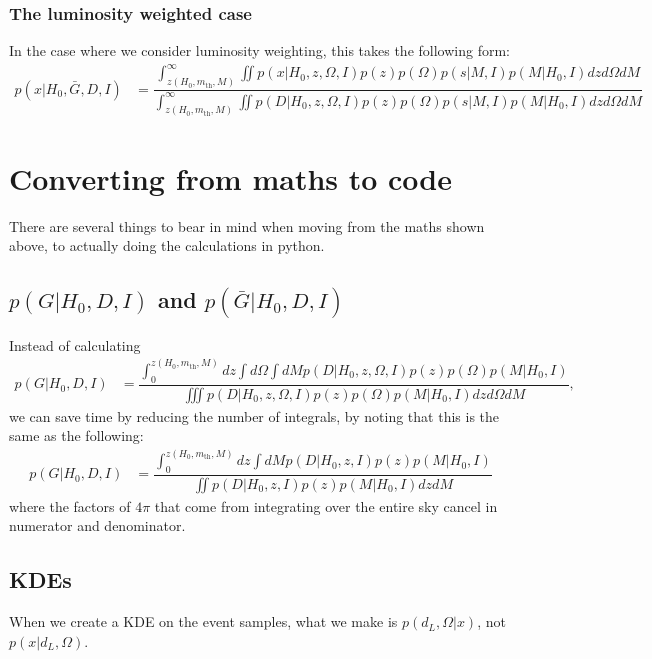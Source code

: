 \documentclass[a4paper,10pt]{article}
\begin{document}
\subsubsection{The luminosity weighted case}
In the case where we consider luminosity weighting, this takes the following form:
\begin{equation}
\begin{aligned}
p(x|H_0,\bar{G},D,I) &= \dfrac{\int^\infty_{z(H_0,m_{\text{th}},M)} \iint p(x|H_0,z,\Omega,I) p(z) p(\Omega) p(s|M,I) p(M|H_0,I) dz d\Omega dM}{\int^\infty_{z(H_0,m_{\text{th}},M)} \iint p(D|H_0,z,\Omega,I) p(z) p(\Omega) p(s|M,I) p(M|H_0,I) dz d\Omega dM}
\end{aligned}
\end{equation}






\section{Converting from maths to code}
There are several things to bear in mind when moving from the maths shown above, to actually doing the calculations in python.

\subsection{$p(G|H_0,D,I)$ and $p(\bar{G}|H_0,D,I)$}
Instead of calculating 
\begin{equation}
\begin{aligned}
p(G|H_0,D,I) &= \dfrac{\int^{z(H_0,m_{\text{th}},M)}_0 dz \int d\Omega \int dM p(D|H_0,z,\Omega,I) p(z)p(\Omega)p(M|H_0,I)}{\iiint p(D|H_0,z,\Omega,I) p(z)p(\Omega)p(M|H_0,I) dz d\Omega dM},
\end{aligned}
\end{equation}
we can save time by reducing the number of integrals, by noting that this is the same as the following:
\begin{equation}
\begin{aligned}
p(G|H_0,D,I) &= \dfrac{\int^{z(H_0,m_{\text{th}},M)}_0 dz \int dM p(D|H_0,z,I) p(z)p(M|H_0,I)}{\iint p(D|H_0,z,I) p(z)p(M|H_0,I) dz dM}
\end{aligned}
\end{equation}
where the factors of $4\pi$ that come from integrating over the entire sky cancel in numerator and denominator.




\subsection{KDEs}
When we create a KDE on the event samples, what we make is $p(d_L,\Omega|x)$, not $p(x|d_L,\Omega)$.
\end{document}
